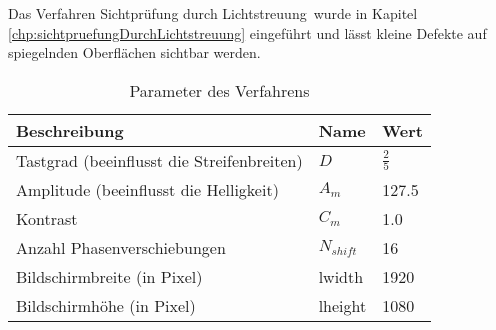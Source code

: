 Das Verfahren \glqq Sichtprüfung durch Lichtstreuung\grqq ~wurde in Kapitel \ref{chp:sichtpruefungDurchLichtstreuung} eingeführt und lässt kleine Defekte auf spiegelnden Oberflächen sichtbar werden.

\begin{table}[H]
	\centering
	\label{tab:paramSichtpruefung}
	\begin{tabular}{lll}
		\hline 
		\textbf{Beschreibung} & \textbf{Name} & \textbf{Wert} \\ 
		\hline 
		Tastgrad (beeinflusst die Streifenbreiten) & $D$ & $\tfrac{2}{5}$ \\ 
		Amplitude (beeinflusst die Helligkeit) & $A_m$ & 127.5 \\ 
		Kontrast & $C_m$ & 1.0 \\ 
		Anzahl Phasenverschiebungen & $N_{shift}$ & 16 \\ 
		Bildschirmbreite (in Pixel) & \acrshort{lwidth} & 1920 \\
		Bildschirmhöhe (in Pixel) & \acrshort{lheight} & 1080 \\ 
		\hline 
	\end{tabular}
	\caption{Parameter des Verfahrens}
\end{table}